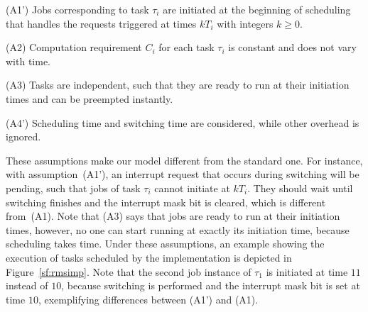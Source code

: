 \documentclass[10pt,journal]{IEEEtran}
\begin{document}
{(A1') Jobs corresponding to task $\tau_i$ are initiated at the
beginning of scheduling that handles the requests triggered at times
$kT_i$ with integers $k\ge 0$.

(A2) Computation requirement $C_i$ for each task $\tau_i$ is constant
and does not vary with time.

(A3) Tasks are independent, such that they are ready to run at their
initiation times and can be preempted instantly.

(A4') Scheduling time and switching time are considered, while other
overhead is ignored.

These assumptions make our model different from the standard one. For
instance, with assumption~(A1'), an interrupt request that occurs
during switching will be pending, such that jobs of task $\tau_i$
cannot initiate at $kT_i$. They should wait until switching finishes
and the interrupt mask bit is cleared, which is different
from~(A1). Note that (A3) says that jobs are ready to run at their
initiation times, however, no one can start running at exactly its
initiation time, because scheduling takes time. Under these
assumptions, an example showing the execution of tasks scheduled by
the implementation is depicted in Figure~\ref{sf:rmsimp}. Note that
the second job instance of $\tau_1$ is initiated at time $11$ instead
of $10$, because switching is performed and the interrupt mask bit is
set at time $10$, exemplifying differences between (A1') and (A1).

\begin{figure}[!t]
\centering
{}
\end{figure}}
\end{document}
